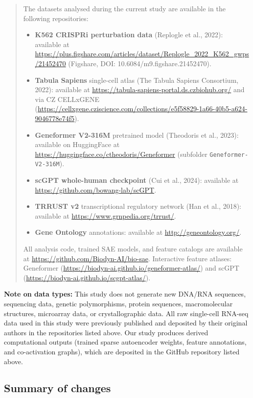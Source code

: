\documentclass[11pt]{article}
\begin{document}
\begin{quote}
\small
The datasets analysed during the current study are available in the following repositories:

\begin{itemize}[leftmargin=1.5em]
\item \textbf{K562 CRISPRi perturbation data} (Replogle et al., 2022): available at \url{https://plus.figshare.com/articles/dataset/Replogle_2022_K562_gwps/21452470} (Figshare, DOI: 10.6084/m9.figshare.21452470).
\item \textbf{Tabula Sapiens} single-cell atlas (The Tabula Sapiens Consortium, 2022): available at \url{https://tabula-sapiens-portal.ds.czbiohub.org/} and via CZ CELLxGENE (\url{https://cellxgene.cziscience.com/collections/e5f58829-1a66-40b5-a624-9046778e74f5}).
\item \textbf{Geneformer V2-316M} pretrained model (Theodoris et al., 2023): available on HuggingFace at \url{https://huggingface.co/ctheodoris/Geneformer} (subfolder \texttt{Geneformer-V2-316M}).
\item \textbf{scGPT whole-human checkpoint} (Cui et al., 2024): available at \url{https://github.com/bowang-lab/scGPT}.
\item \textbf{TRRUST v2} transcriptional regulatory network (Han et al., 2018): available at \url{https://www.grnpedia.org/trrust/}.
\item \textbf{Gene Ontology} annotations: available at \url{http://geneontology.org/}.
\end{itemize}

All analysis code, trained SAE models, and feature catalogs are available at \url{https://github.com/Biodyn-AI/bio-sae}. Interactive feature atlases: Geneformer (\url{https://biodyn-ai.github.io/geneformer-atlas/}) and scGPT (\url{https://biodyn-ai.github.io/scgpt-atlas/}).
\end{quote}

\textbf{Note on data types:} This study does not generate new DNA/RNA sequences, sequencing data, genetic polymorphisms, protein sequences, macromolecular structures, microarray data, or crystallographic data. All raw single-cell RNA-seq data used in this study were previously published and deposited by their original authors in the repositories listed above. Our study produces derived computational outputs (trained sparse autoencoder weights, feature annotations, and co-activation graphs), which are deposited in the GitHub repository listed above.

\subsection*{Summary of changes}
\end{document}
